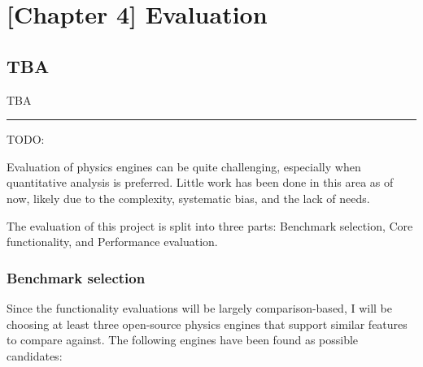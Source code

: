 \documentclass[runningheads]{llncs}
\begin{document}
\chapter{[Chapter 4] Evaluation}

\section{TBA}

TBA

\noindent\rule{12cm}{0.4pt}

TODO:


Evaluation of physics engines can be quite challenging, 
especially when quantitative analysis is preferred.
Little work has been done in this area as of now, 
likely due to the complexity, systematic bias, and the lack of needs.

The evaluation of this project is split into three parts: Benchmark selection, Core functionality, and Performance evaluation.

\subsection{Benchmark selection}

Since the functionality evaluations will be largely comparison-based,
I will be choosing at least three open-source physics engines that support similar features to compare against.
The following engines have been found as possible candidates:
\end{document}
